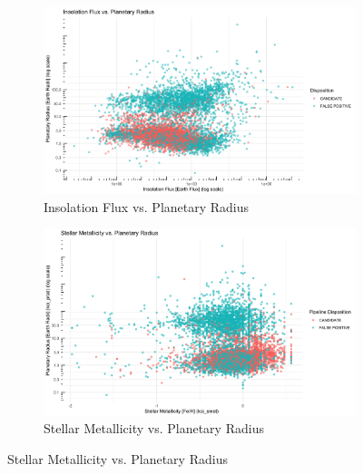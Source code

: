 \begin{figure}[H]
    \begin{subfigure}[b]{0.45\textwidth}
        \includegraphics[width=\textwidth]{Immagini/flux_radius.png}
        \caption{Insolation Flux vs. Planetary Radius}
    \end{subfigure}
    \begin{subfigure}[b]{0.45\textwidth}
        \includegraphics[width=\textwidth]{Immagini/metallicity.png}
        \caption{Stellar Metallicity vs. Planetary Radius}
    \end{subfigure}
    
    \vspace{0.5cm}
    

\end{figure}

